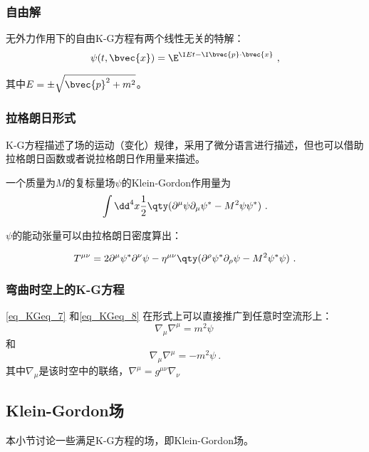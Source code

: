 \subsubsection{自由解}

无外力作用下的自由K-G方程有两个线性无关的特解：
\begin{equation}
\psi(t, \bvec{x}) = \E^{\I Et-\I \bvec{p}\cdot\bvec{x}}~,
\end{equation}

其中$E=\pm\sqrt{\bvec{p}^2+m^2}$。





\subsubsection{拉格朗日形式}


K-G方程描述了场的运动（变化）规律，采用了微分语言进行描述，但也可以借助拉格朗日函数或者说拉格朗日作用量来描述。

一个质量为$M$的复标量场$\psi$的Klein-Gordon作用量为
\begin{equation}
\int {\dd}^4 x \frac{1}{2}\qty(\partial^\mu\psi\partial_\mu\psi^*-M^2\psi\psi^*)~.
\end{equation}

$\psi$的能动张量可以由拉格朗日密度算出：

\begin{equation}
T^{\mu\nu} = 2\partial^\mu\psi^*\partial^\nu\psi-\eta^{\mu\nu}\qty(\partial^\rho\psi^*\partial_\rho\psi-M^2\psi^*\psi)~.
\end{equation}


\subsubsection{弯曲时空上的K-G方程}

\autoref{eq_KGeq_7} 和\autoref{eq_KGeq_8} 在形式上可以直接推广到任意时空流形上：
\begin{equation}
\nabla_\mu\nabla^\mu=m^2\psi~
\end{equation}
和
\begin{equation}
\nabla_\mu\nabla^\mu=-m^2\psi~.
\end{equation}
其中$\nabla_\mu$是该时空中的联络，$\nabla^\mu=g^{\mu\nu}\nabla_\nu$





\subsection{Klein-Gordon场}\label{sub_KGeq_1}

本小节讨论一些满足K-G方程的场，即Klein-Gordon场。


























